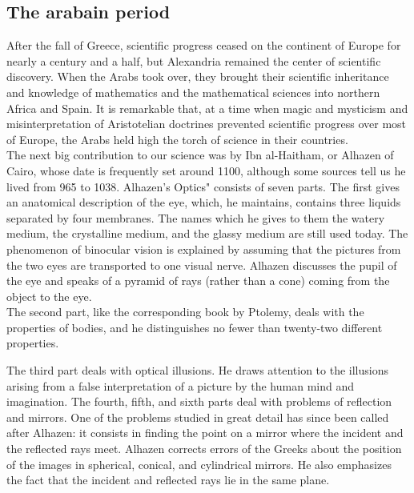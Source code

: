             
        \subsection{The arabain period}

            After the fall of Greece, scientific progress ceased on the continent of Europe for nearly a century and a half, but Alexandria remained the center of scientific discovery. When the Arabs took over, they brought their scientific inheritance and knowledge of mathematics and the mathematical sciences into northern Africa and Spain. It is remarkable that, at a time when magic and mysticism and misinterpretation of Aristotelian doctrines prevented scientific progress over most of Europe, the Arabs held high the torch of science in their countries.\\

            The next big contribution to our science was by Ibn al-Haitham, or Alhazen of Cairo, whose date is frequently set around 1100, although some sources tell us he lived from 965 to 1038. Alhazen's Optics" consists of seven parts. The first gives an anatomical description of the eye, which, he maintains, contains three liquids separated by four membranes. The names which he gives to them the watery medium, the crystalline medium, and the glassy medium are still used today. The phenomenon of binocular vision is explained by assuming that the pictures from the two eyes are transported to one visual nerve. Alhazen discusses the pupil of the eye and speaks of a pyramid of rays (rather than a cone) coming from the object to the eye.\\

            The second part, like the corresponding book by Ptolemy, deals with the properties of bodies, and he distinguishes no fewer than twenty-two different properties.
            
            The third part deals with optical illusions. He draws attention to the illusions arising from a false interpretation of a picture by the human mind and imagination. The fourth, fifth, and sixth parts deal with problems of reflection and mirrors. One of the problems studied in great detail has since been called after Alhazen: it consists in finding the point on a mirror where the incident and the reflected rays meet. Alhazen corrects errors of the Greeks about the position of the images in spherical, conical, and cylindrical mirrors. He also emphasizes the fact that the incident and reflected rays lie in the same plane.\\

